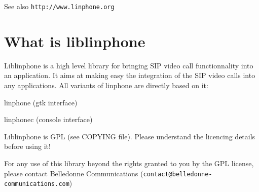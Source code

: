 \begin{DoxySeeAlso}{\-See also}
{\tt http\-://www.\-linphone.\-org}
\end{DoxySeeAlso}
\section{\-What is liblinphone}\label{index_what_is_it}
\-Liblinphone is a high level library for bringing \-S\-I\-P video call functionnality into an application. \-It aims at making easy the integration of the \-S\-I\-P video calls into any applications. \-All variants of linphone are directly based on it\-:
\begin{DoxyItemize}
\item linphone (gtk interface)
\end{DoxyItemize}


\begin{DoxyItemize}
\item linphonec (console interface)
\end{DoxyItemize}

\-Liblinphone is \-G\-P\-L (see \-C\-O\-P\-Y\-I\-N\-G file). \-Please understand the licencing details before using it!

\-For any use of this library beyond the rights granted to you by the \-G\-P\-L license, please contact \-Belledonne \-Communications ({\tt contact@belledonne-\/communications.\-com}) 